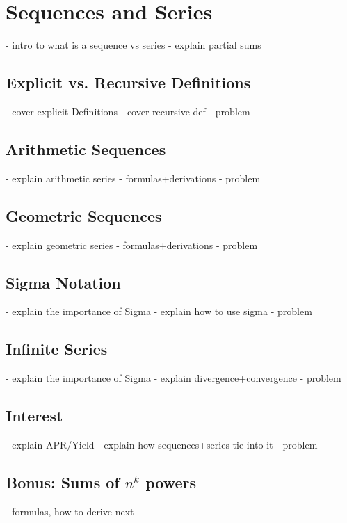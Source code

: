 \chapter{Sequences and Series}
- intro to what is a sequence vs series
- explain partial sums
\section{Explicit vs. Recursive Definitions}
- cover explicit Definitions
- cover recursive def 
- problem
\section{Arithmetic Sequences}
- explain arithmetic series
- formulas+derivations
- problem
\section{Geometric Sequences}
- explain geometric series
- formulas+derivations
- problem
\section{Sigma Notation}
- explain the importance of Sigma
- explain how to use sigma
- problem
\section{Infinite Series}
- explain the importance of Sigma
- explain divergence+convergence
- problem
\section{Interest}
- explain APR/Yield
- explain how sequences+series tie into it
- problem

\begin{subappendices}
\section{Bonus: Sums of $n^k$ powers}
    - formulas, how to derive next
    - 
\end{subappendices}